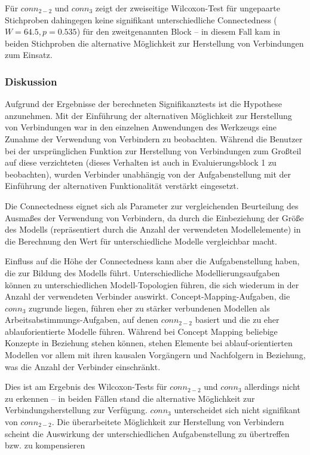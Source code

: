 Für $conn_{2-2}$ und $conn_{3}$ zeigt der zweiseitige Wilcoxon-Test für ungepaarte Stichproben dahingegen keine signifikant unterschiedliche Connectedness ($W=64.5, p=0.535$) für den zweitgenannten Block -- in diesem Fall kam in beiden Stichproben die alternative Möglichkeit zur Herstellung von Verbindungen zum Einsatz.

\subsubsection{Diskussion} %

Aufgrund der Ergebnisse der berechneten Signifikanztests ist die Hypothese anzunehmen. Mit der Einführung der alternativen Möglichkeit zur Herstellung von Verbindungen war in den einzelnen Anwendungen des Werkzeugs eine Zunahme der Verwendung von Verbindern zu beobachten. Während die Benutzer bei der ursprünglichen Funktion zur Herstellung von Verbindungen zum Großteil auf diese verzichteten (dieses Verhalten ist auch in Evaluierungsblock 1 zu beobachten), wurden Verbinder unabhängig von der Aufgabenstellung mit der Einführung der alternativen Funktionalität verstärkt eingesetzt.

Die Connectedness eignet sich als Parameter zur vergleichenden Beurteilung des Ausmaßes der Verwendung von Verbindern, da durch die Einbeziehung der Größe des Modells (repräsentiert durch die Anzahl der verwendeten Modellelemente) in die Berechnung den Wert für unterschiedliche Modelle vergleichbar macht. 

Einfluss auf die Höhe der Connectedness kann aber die Aufgabenstellung haben, die zur Bildung des Modells führt. Unterschiedliche Modellierungsaufgaben können zu unterschiedlichen Modell-Topologien führen, die sich wiederum in der Anzahl der verwendeten Verbinder auswirkt. Concept-Mapping-Aufgaben, die $conn_{3}$ zugrunde liegen, führen eher zu stärker verbundenen Modellen als Arbeitsabstimmungs-Aufgaben, auf denen $conn_{2-2}$ basiert und die zu eher ablauforientierte Modelle führen. Während bei Concept Mapping beliebige Konzepte in Beziehung stehen können, stehen Elemente bei ablauf-orientierten Modellen vor allem mit ihren kausalen Vorgängern und Nachfolgern in Beziehung, was die Anzahl der Verbinder einschränkt.

Dies ist am Ergebnis des Wilcoxon-Tests für $conn_{2-2}$ und $conn_{3}$ allerdings nicht zu erkennen -- in beiden Fällen stand die alternative Möglichkeit zur Verbindungsherstellung zur Verfügung. $conn_{3}$ unterscheidet sich nicht signifikant von $conn_{2-2}$. Die überarbeitete Möglichkeit zur Herstellung von Verbindern scheint die Auswirkung der unterschiedlichen Aufgabenstellung zu übertreffen bzw. zu kompensieren

